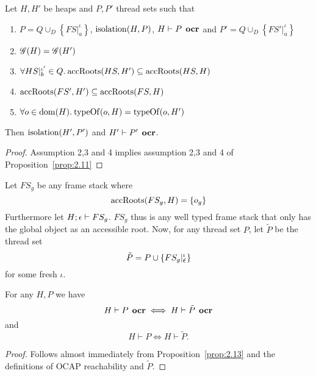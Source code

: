 \begin{corollary} \label{cor:2.11}
  Let $H, H'$ be heaps and $P, P'$ thread sets such that
  \begin{enumerate}
    \item $P = Q \cup_D \left\{ FS|_a^\iota \right\}$, $\mbox{$\mathrm{isolation}$}{(H, P)}$, $H
      \vdash P \:\: \mbox{\bf ocr}$ and $P' = Q \cup_D \left\{ FS'|_a^\iota \right\}$
    \item $\mathscr{G}{(H)} = \mathscr{G}{(H')}$
    \item $\forall HS|_b^{\iota'} \in Q. \: \mbox{$\mathrm{accRoots}$}{(HS, H')} \subseteq \mbox{$\mathrm{accRoots}$}{(HS, H)}$
    \item $\mbox{$\mathrm{accRoots}$}{(FS', H')} \subseteq \mbox{$\mathrm{accRoots}$}{(FS, H)}$
    \item $\forall o \in \mbox{$\mathrm{dom}$}{(H)}. \: \mbox{$\mathrm{typeOf}$}{(o, H)} = \mbox{$\mathrm{typeOf}$}{(o, H')}$
  \end{enumerate}
  Then $\mbox{$\mathrm{isolation}$}{(H', P')}$ and $H' \vdash P' \:\: \mbox{\bf ocr}$.
\end{corollary}

\begin{proof}
  Assumption 2,3 and 4 implies assumption 2,3 and 4 of
  Proposition~\ref{prop:2.11}
\end{proof}

\begin{definition} \label{def:ptilde}
  Let $FS_g$ be any frame stack where 
  \begin{equation*}
    \mbox{$\mathrm{accRoots}$}(FS_g, H) = \left\{ o_g \right\}
  \end{equation*}
  Furthermore let $H; \mbox{$\epsilon$} \vdash FS_g$.
  $FS_g$ thus is any well typed frame stack that only has the global object as
  an accessible root.  Now, for any thread set $P$, let $\tilde{P}$ be the
  thread set
  \begin{equation*}
    \tilde{P} = P \cup \left\{ FS_g|_{\mbox{$\epsilon$}}^\iota \right\}
  \end{equation*}
  for some fresh $\iota$.
\end{definition}

\begin{proposition} \label{prop:ocrtilde_eq}
  For any $H, P$ we have
  \begin{equation*}
    H \vdash P \:\: \mbox{\bf ocr} \iff H \vdash \tilde{P} \:\: \mbox{\bf ocr}
  \end{equation*}
  and
  \begin{equation*}
    H \vdash P  \iff H \vdash \tilde{P}. 
  \end{equation*}
\end{proposition}
\begin{proof}
  Follows almost immediately from Proposition~\ref{prop:2.13} and the
  definitions of OCAP reachability and $\tilde{P}$.
\end{proof}

